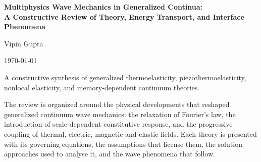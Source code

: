 \begin{titlepage}
\centering
\vspace*{2cm}
{\LARGE\bfseries Multiphysics Wave Mechanics in Generalized Continua:\\[0.3em]
A Constructive Review of Theory, Energy Transport, and Interface Phenomena\par}
\vspace{1.8cm}
{\large Vipin Gupta\par}
\vspace{0.6cm}
{\large \today\par}
\vfill
{\small A constructive synthesis of generalized thermoelasticity, piezothermoelasticity, nonlocal elasticity, and memory-dependent continuum theories.\par}
\vspace{0.5cm}
{\small \begin{minipage}{0.85\textwidth}\small
The review is organized around the physical developments that reshaped generalized continuum
wave mechanics: the relaxation of Fourier's law, the introduction of scale-dependent constitutive
response, and the progressive coupling of thermal, electric, magnetic and elastic fields.
Each theory is presented with its governing equations, the assumptions that license them,
the solution approaches used to analyse it, and the wave phenomena that follow.
\par\end{minipage}\par}
\end{titlepage}
